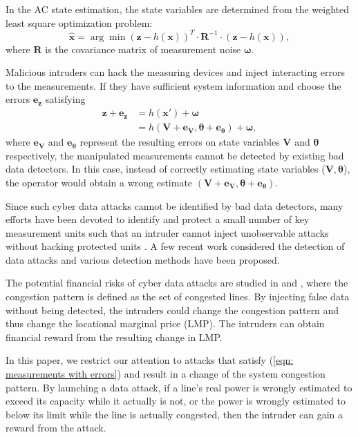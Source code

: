 \documentclass[conference,letterpaper,10pt]{IEEEtran}
\begin{document}
In the AC state estimation, the state variables are determined from the weighted least square optimization problem:
\begin{equation}
\bm{\hat{x}}=\arg\min(\bm{z}-h(\bm{x}))^T\cdot\bm{R}^{-1}\cdot(\bm{z}-h(\bm{x})),
\end{equation}
where $\bm{R}$ is the covariance matrix of measurement noise $\bm{\omega}$.

Malicious intruders can hack the measuring devices and inject interacting errors to the measurements. If they have sufficient system information and choose the errors $\bm{e_z}$ satisfying
\begin{equation}\label{eqn: measurements with errors}
\begin{split}
\bm{z}+\bm{e_z} & =h(\bm{x'})+\bm{\omega}\\
& =h(\bm{V}+\bm{e_V},\bm{\theta}+\bm{e_\theta})+\bm{\omega},
\end{split}
\end{equation}
where $\bm{e_V}$ and $\bm{e_\theta}$ represent the resulting errors on state variables $\bm{V}$ and $\bm{\theta}$ respectively, the manipulated measurements cannot be detected by existing bad data detectors. In this case, instead of correctly estimating state variables ($\bm{V},\bm{\theta}$), the operator would obtain a wrong estimate $(\bm{V}+\bm{e_V},\bm{\theta}+\bm{e_\theta})$.




Since such cyber data attacks cannot be identified by   bad data detectors, 
many efforts have been devoted to identify and protect  a small number of key measurement units such that an intruder cannot inject unobservable attacks without hacking protected units  \cite{BRWKNO10,DS10,KP11}. A few recent work \cite{SJ13,LEDEH14,WGGCFSR14} considered the detection of data attacks and various detection methods have been proposed.

The potential financial risks of cyber data attacks are studied in \cite{XMS11} and \cite{JKT14}, where the congestion pattern is defined as the set of congested lines.  By injecting false data without being detected, the intruders could change the congestion pattern and thus change the locational marginal price (LMP). The intruders can obtain financial reward from the resulting change in LMP. 

In this paper, we restrict our attention to attacks that satisfy (\ref{eqn: measurements with errors}) and result in a change of the system congestion pattern. By launching a data attack, if a line's real power is wrongly estimated to exceed its capacity while it actually is not, or the power is wrongly estimated to below its limit while the line is actually congested, then the intruder can gain a reward from the attack. 
\end{document}
